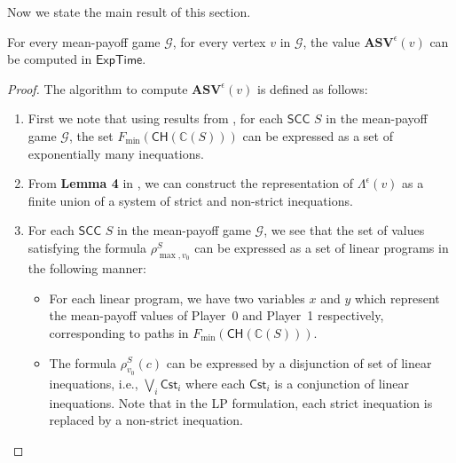 Now we state the main result of this section.
\begin{theorem}
    For every mean-payoff game $\mathcal{G}$, for every vertex $v$ in $\mathcal{G}$, the value $\mathbf{ASV}^{\epsilon}(v)$ can be computed in $\mathsf{ExpTime}$.
\end{theorem}
\begin{proof}
The algorithm to compute $\mathbf{ASV}^{\epsilon}(v)$ is defined as follows:
\begin{enumerate}
    \item First we note that using 
    results from \cite{CDEHR10},
    for each $\mathsf{SCC}$ $S$ in the mean-payoff game $\mathcal{G}$, the set $F_{\min}(\mathsf{CH}(\mathbb{C}(S)))$ can be expressed as a set of exponentially many inequations.
    \item From \textbf{Lemma 4} in \cite{BR15}, we can construct the representation of $\Lambda^{\epsilon}(v)$ as a finite union of a system of strict and non-strict inequations. 
    \item For each $\mathsf{SCC}$ $S$ in the mean-payoff game $\mathcal{G}$, we see that the set of values satisfying the formula $\rho^S_{\max,v_0}$ can be expressed as a set of linear programs in the following manner: 
    \begin{itemize}
      \item For each linear program, we have two variables $x$ and $y$ which represent the mean-payoff values of Player~0 and Player~1 respectively, corresponding to paths in $F_{\min}(\mathsf{CH}(\mathbb{C}(S)))$.
      \item The 
      formula $\rho^S_{v_0}(c)$ can be expressed by a disjunction of set of linear inequations, i.e., $\bigvee_i \mathsf{Cst}_i$ where each $\mathsf{Cst}_i$ is a conjunction of linear inequations.
      Note that in the LP formulation, each strict inequation is replaced by a non-strict inequation.
      

\end{itemize}
\end{enumerate}
\end{proof}
